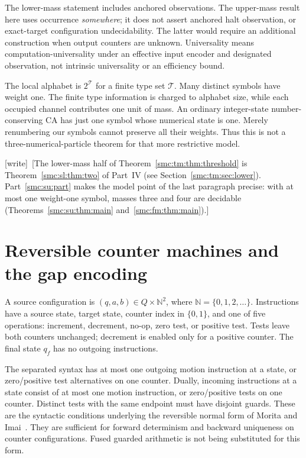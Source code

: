 \documentclass[11pt,letterpaper]{article}
\numberwithin{equation}{section}
\theoremstyle{definition}
\theoremstyle{remark}
\newcommand{\NN}{\mathbb N}
\newcommand{\wtag}{\textup{[write]}}
\begin{document}
The lower-mass statement includes anchored observations. The upper-mass result here uses occurrence \emph{somewhere}; it does not assert anchored halt observation, or exact-target configuration undecidability. The latter would require an additional construction when output counters are unknown. Universality means computation-universality under an effective input encoder and designated observation, not intrinsic universality or an efficiency bound.

The local alphabet is $2^{\mathcal T}$ for a finite type set $\mathcal T$. Many distinct symbols have weight one. The finite type information is charged to alphabet size, while each occupied channel contributes one unit of mass. An ordinary integer-state number-conserving CA has just one symbol whose numerical state is one. Merely renumbering our symbols cannot preserve all their weights. Thus this is not a three-numerical-particle theorem for that more restrictive model.

\wtag\ [The lower-mass half of Theorem~\ref{smc:tm:thm:threshold} is Theorem~\ref{smc:sl:thm:two} of Part~IV (see Section~\ref{smc:tm:sec:lower}). Part~\ref{smc:su:part} makes the model point of the last paragraph precise: with at most one weight-one symbol, masses three and four are decidable (Theorems~\ref{smc:su:thm:main} and~\ref{smc:fm:thm:main}).]

\section{Reversible counter machines and the gap encoding}\label{smc:tm:sec:source}

A source configuration is $(q,a,b)\in Q\times\NN^2$, where $\NN=\{0,1,2,\ldots\}$. Instructions have a source state, target state, counter index in $\{0,1\}$, and one of five operations: increment, decrement, no-op, zero test, or positive test. Tests leave both counters unchanged; decrement is enabled only for a positive counter. The final state $q_f$ has no outgoing instructions.

The separated syntax has at most one outgoing motion instruction at a state, or zero/positive test alternatives on one counter. Dually, incoming instructions at a state consist of at most one motion instruction, or zero/positive tests on one counter. Distinct tests with the same endpoint must have disjoint guards. These are the syntactic conditions underlying the reversible normal form of Morita and Imai~\cite{moritaimai}. They are sufficient for forward determinism and backward uniqueness on counter configurations. Fused guarded arithmetic is not being substituted for this form.
\end{document}

